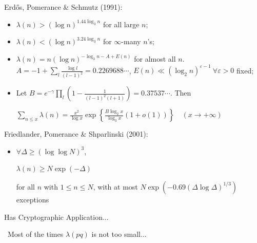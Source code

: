 \documentclass[landscape]{powersem} %
\newcommand{\manorossa}{\textcolor{conceptcolor}{\ding{43}}}
\newcommand{\heading}[1]{%
 \begin{center}
  \large\bf
  \shadowbox{{\textcolor{conceptcolor}{#1}}}%
 \end{center}
 \vspace{1ex minus 1ex}}
\begin{document}
\begin{slide}
\heading{Minimal, Normal and Average Orders of $\lambda$}\pause

\textcolor{OliveGreen}{Erd\H os, Pomerance \&  Schmutz} (1991):\pause

\begin{itemize}
    \item[\manorossa] $\lambda(n)>(\log n)^{1.44\log_3n}$ for all large $n$;\bigskip\pause

   \item[\manorossa] $\lambda(n)<(\log n)^{3.24\log_3n}$ for $\infty$-many $n$'s;\bigskip\pause

  \item[\manorossa] $\lambda(n)=n(\log n)^{-\log_3n-A+E(n)}$ for almost all $n$.\pause
$A=-1+\displaystyle{\sum_{l}\frac{\log l}{(l-1)^2}=0.2269688}\cdots$, $E(n)\ll (\log_2n)^{\varepsilon-1}\ \forall\varepsilon>0$ fixed;\bigskip\pause

    \item[\manorossa] Let $B=e^{-\gamma}\displaystyle{\prod_{l}\left(1-\frac1{(l-1)^2(l+1)}\right)=0.37537\cdots}$. Then

\centerline{$\displaystyle{\sum_{n\le x}\lambda(n) =\frac {x^2}{\log x} \exp \left\{\frac
{B\log_2x} {\log_3x} (1+o(1)) \right\}\quad (x\to +\infty)}$}

\end{itemize}
\end{slide}


\begin{slide}
\heading{A recent result}\pause

\textcolor{OliveGreen}{Friedlander, Pomerance \& Shparlinski} (2001):\pause

\begin{itemize}
\item[\manorossa] $\forall\Delta\geq(\log\log N)^3$,\pause\medskip

\centerline{$\displaystyle{\lambda(n)\geq N\exp(-\Delta)}$}

for all $n$ with  $1\leq n\leq N$,
with at most
$N\exp(-0.69(\Delta\log\Delta)^{1/3})$
exceptions
\end{itemize}\pause\bigskip\bigskip

\centerline{\textcolor{BurntOrange}{Has Cryptographic Application...}}\pause\bigskip

\ \hfill\manorossa Most of the times $\lambda(pq)$ is not too small...
\end{slide}

%
%
%
\end{document}
